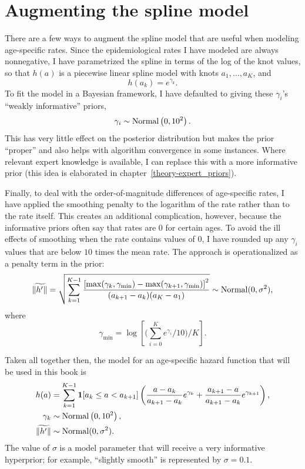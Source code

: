 \section{Augmenting the spline model}
There are a few ways to augment the spline model that are useful when
modeling age-specific rates. Since the epidemiological rates I have modeled
are always nonnegative, I have parametrized the spline in
terms of the log of the knot values, so that $h(a)$ is a piecewise
linear spline model with knots $a_1,\ldots,a_K$, and
\[
h(a_k) = e^{\gamma_k}.
\]
To fit the model in a Bayesian framework, I have defaulted to
giving these $\gamma_i$'s ``weakly informative'' priors,
\[
\gamma_i \sim \operatorname{Normal}\left(0, 10^2\right).
\]
This has very little effect on the posterior distribution but makes
the prior ``proper'' and also helps with algorithm convergence in
some instances. Where relevant expert knowledge is
available, I can replace this with a more informative prior (this idea
is elaborated in chapter~\ref{theory-expert_priors}).

Finally, to deal with the order-of-magnitude differences of
age-specific rates, I have applied the smoothing penalty to the
logarithm of the rate rather than to the rate itself.  This creates an additional
complication, however, because the informative priors often say that
rates are $0$ for certain ages.  To avoid the ill effects of
smoothing when the rate contains values of $0$, I have
rounded up any $\gamma_i$ values that are below $10$ times the mean
rate.  The approach is operationalized as a penalty term in the prior:
\[
\widetilde{\|h'\|} = \sqrt{\sum_{k=1}^{K-1}
\frac{\left[\max(\gamma_k, \gamma_{\min})
-
\max(\gamma_{k+1}, \gamma_{\min})\right]^2
}{(a_{k+1}-a_k)(a_K-a_1)}} \sim \operatorname{Normal}(0, \sigma^2),
\]
where
\[
\gamma_{\min} = \log\left[\bigg(\sum_{i=0}^K e^{\gamma_i}/10\bigg)
/ K\right].
\]

Taken all together then, the model for an age-specific hazard function
that will be used in this book is
\begin{align*}
h(a) &= \sum_{k=1}^{K-1} \mathbf{1}[a_k \leq a < a_{k+1}]
\left( \frac{a-a_k}    {a_{k+1}-a_k} e^{\gamma_k}
     + \frac{a_{k+1}-a}{a_{k+1}-a_k} e^{\gamma_{k+1}}\right),\\
\gamma_k &\sim \operatorname{Normal}\left(0, 10^2\right),\\
\widetilde{\|h'\|} &\sim \operatorname{Normal}(0, \sigma^2).\\
\end{align*}
The value of $\sigma$ is a model parameter that will receive a very
informative hyperprior; for example, ``slightly smooth'' is
represented by $\sigma=0.1$.




